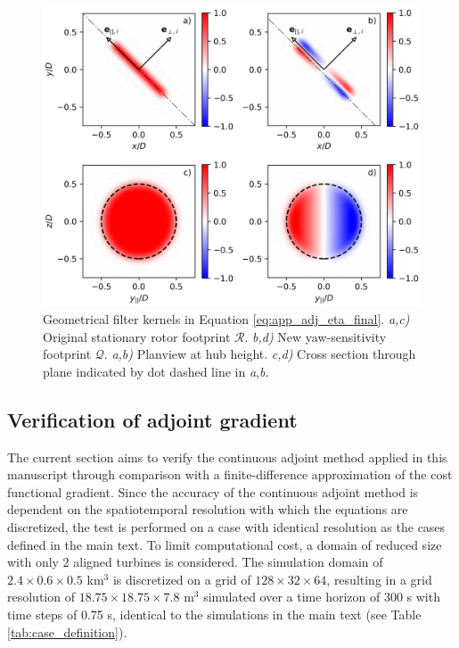 \documentclass[energies,article,submit,moreauthors,latex,10pt,a4paper]{mdpi}
\newcommand{\R}{\mathscr{R}}
\begin{document}
\begin{figure}
	\includegraphics[width=\textwidth]{figure17}
	\caption{Geometrical filter kernels in Equation \eqref{eq:app_adj_eta_final}. \emph{a,c)} Original stationary rotor footprint $\R$. \emph{b,d)} New yaw-sensitivity footprint $\mathscr{Q}$. \emph{a,b)} Planview at hub height. \emph{c,d)} Cross section through plane indicated by dot dashed line in \emph{a},\emph{b}. \label{fig:filters}}
\end{figure}

\subsection{Verification of adjoint gradient}\label{sec:app_adj_verif}
\noindent The current section aims to verify the continuous adjoint method applied in this manuscript through comparison with a finite-difference approximation of the cost functional gradient. Since the accuracy of the continuous adjoint method is dependent on the spatiotemporal resolution with which the equations are discretized, the test is performed on a case with identical resolution as the cases defined in the main text. To limit computational cost, a domain of reduced size with only 2 aligned turbines is considered. The simulation domain of $2.4 \times 0.6 \times 0.5$ km$^3$ is discretized on a grid of $128 \times 32 \times 64$, resulting in a grid resolution of $18.75 \times 18.75 \times 7.8$ m$^3$ simulated over a time horizon of 300 s with time steps of 0.75 s, identical to the simulations in the main text (see Table \ref{tab:case_definition}).
\end{document}
